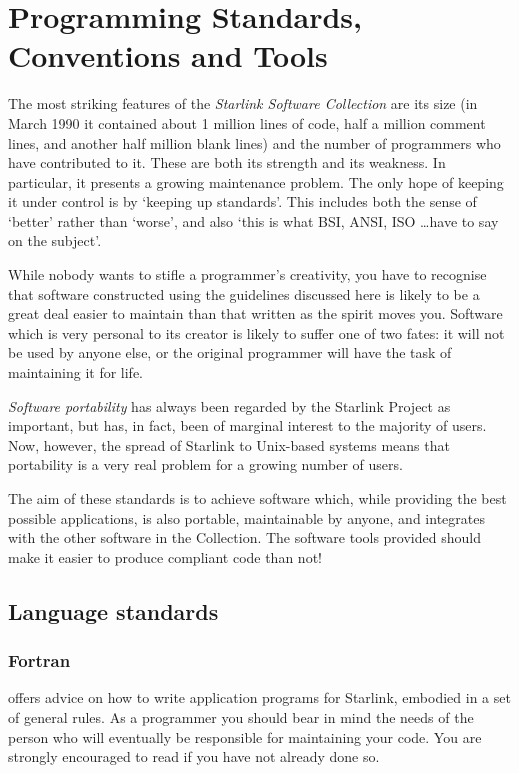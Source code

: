 \chapter{Programming Standards, Conventions and Tools}
\label{C_standards}

The most striking features of the {\em Starlink Software Collection} are
its size (in March 1990 it contained about 1 million lines of code, half a
million comment lines, and another half million blank lines) and the number of
programmers who have contributed to it.
These are both its strength and its weakness.
In particular, it presents a growing maintenance problem.
The only hope of keeping it under control is by `keeping up standards'.
This includes both the sense of `better' rather than `worse', and also `this
is what BSI, ANSI, ISO \ldots have to say on the subject'.

While nobody wants to stifle a programmer's creativity, you have to recognise
that software constructed using the guidelines discussed here is likely to be
a great deal easier to maintain than that written as the spirit moves you.
Software which is very personal to its creator is likely to suffer one of
two fates: it will not be used by anyone else, or the original programmer
will have the task of maintaining it for life.

{\em Software portability} has always been regarded by the Starlink Project as
important, but has, in fact, been of marginal interest to the majority of
users.
Now, however, the spread of Starlink to Unix-based systems means that
portability is a very real problem for a growing number of users.

The aim of these standards is to achieve software which, while providing the
best possible applications, is also portable, maintainable by anyone, and
integrates with the other software in the Collection.
The software tools provided should make it easier to produce compliant
code than not!

\section{Language standards}
\label{S_langstand}

\subsection{Fortran}

 offers advice on how to write application programs for
Starlink, embodied in a set of general rules.
As a programmer you should bear in mind the needs of the person who will
eventually be responsible for maintaining your code.
You are strongly encouraged to read 
 if you have not already done so.

